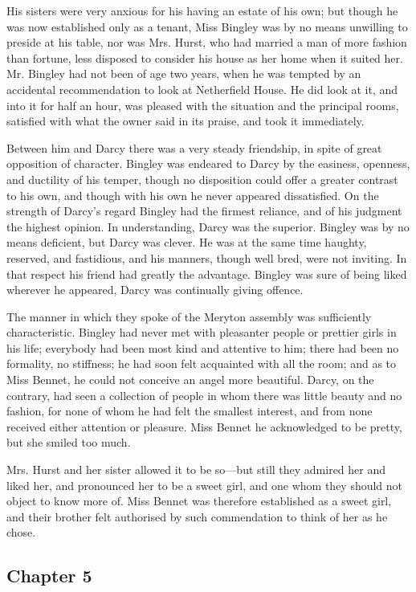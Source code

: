 His sisters were very anxious for his having an estate of his own; but though he was now established only as a tenant, Miss Bingley was by no means unwilling to preside at his table, nor was Mrs. Hurst, who had married a man of more fashion than fortune, less disposed to consider his house as her home when it suited her. Mr. Bingley had not been of age two years, when he was tempted by an accidental recommendation to look at Netherfield House. He did look at it, and into it for half an hour, was pleased with the situation and the principal rooms, satisfied with what the owner said in its praise, and took it immediately.

Between him and Darcy there was a very steady friendship, in spite of great opposition of character. Bingley was endeared to Darcy by the easiness, openness, and ductility of his temper, though no disposition could offer a greater contrast to his own, and though with his own he never appeared dissatisfied. On the strength of Darcy's regard Bingley had the firmest reliance, and of his judgment the highest opinion. In understanding, Darcy was the superior. Bingley was by no means deficient, but Darcy was clever. He was at the same time haughty, reserved, and fastidious, and his manners, though well bred, were not inviting. In that respect his friend had greatly the advantage. Bingley was sure of being liked wherever he appeared, Darcy was continually giving offence.

The manner in which they spoke of the Meryton assembly was sufficiently characteristic. Bingley had never met with pleasanter people or prettier girls in his life; everybody had been most kind and attentive to him; there had been no formality, no stiffness; he had soon felt acquainted with all the room; and as to Miss Bennet, he could not conceive an angel more beautiful. Darcy, on the contrary, had seen a collection of people in whom there was little beauty and no fashion, for none of whom he had felt the smallest interest, and from none received either attention or pleasure. Miss Bennet he acknowledged to be pretty, but she smiled too much.

Mrs. Hurst and her sister allowed it to be so---but still they admired her and liked her, and pronounced her to be a sweet girl, and one whom they should not object to know more of. Miss Bennet was therefore established as a sweet girl, and their brother felt authorised by such commendation to think of her as he chose.

\subsection[chapter-5]{\useURL[url5][][][]\from[url5] Chapter 5}

